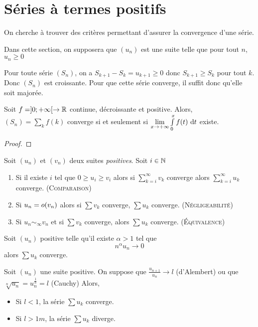 \section{Séries à termes positifs}
On cherche à trouver des critères permettant d'assurer la convergence d'une série.

Dans cette section, on supposera que $(u_n)$ est une suite telle que pour tout $n$, $u_n\geq0$

\begin{rem}
Pour toute série $(S_n)$, on a $S_{k+1}-S_k = u_{k+1}\geq0$ donc $S_{k+1}\geq S_k$ pour tout $k$. Donc $(S_n)$ est croissante. Pour que cette série converge, il suffit donc qu'elle soit majorée.
\end{rem}

\begin{prop}
Soit $f=]0;+\infty[\to\mathbb{R}$ continue, décroissante et positive. Alors, $(S_n) = \sum\limits_k f(k)$ converge si et seulement si $\lim\limits_{x\to+\infty}\int\limits_0^x f(t)\,\,\mathrm{d} t$ existe.
\end{prop}
\begin{proof}\end{proof}

\begin{prop}
Soit $(u_n)$ et $(v_n)$ deux suites \emph{positives}. Soit $i\in\mathbb{N}$
\begin{enumerate}
	\item Si il existe $i$ tel que $0 \geq u_i \geq v_i$ alors si $\sum\limits_{k=i}^\infty v_k$ converge alors $\sum\limits_{k=i}^\infty u_k$ converge. (\textsc{Comparaison})
	\item Si $u_n=o(v_n)$ alors si $\sum v_k$ converge, $\sum u_k$ converge. (\textsc{Négligeabilité})
	\item Si $u_n\sim_\infty v_n$ et si $\sum v_k$ converge, alors $\sum u_k$ converge. (\textsc{Équivalence})
\end{enumerate}
\end{prop}

\begin{prop}
Soit $(u_n)$ positive telle qu'il existe $\alpha > 1$ tel que
$$n^\alpha u_n\to0$$
alors $\sum u_k$ converge.
\end{prop}

\begin{prop}
Soit $(u_n)$ une suite positive.
On suppose que $\frac{u_{n+1}}{u_n}\to l$ (d'Alembert) ou que $\sqrt[n]{u_n}=u^{\frac{1}{n}}_n=l$ (Cauchy)
Alors,
\begin{itemize}
	\item Si $l<1$, la série $\sum u_k$ converge.
	\item Si $l>1m$, la série $\sum u_k$ diverge.
\end{itemize}
\end{prop}

